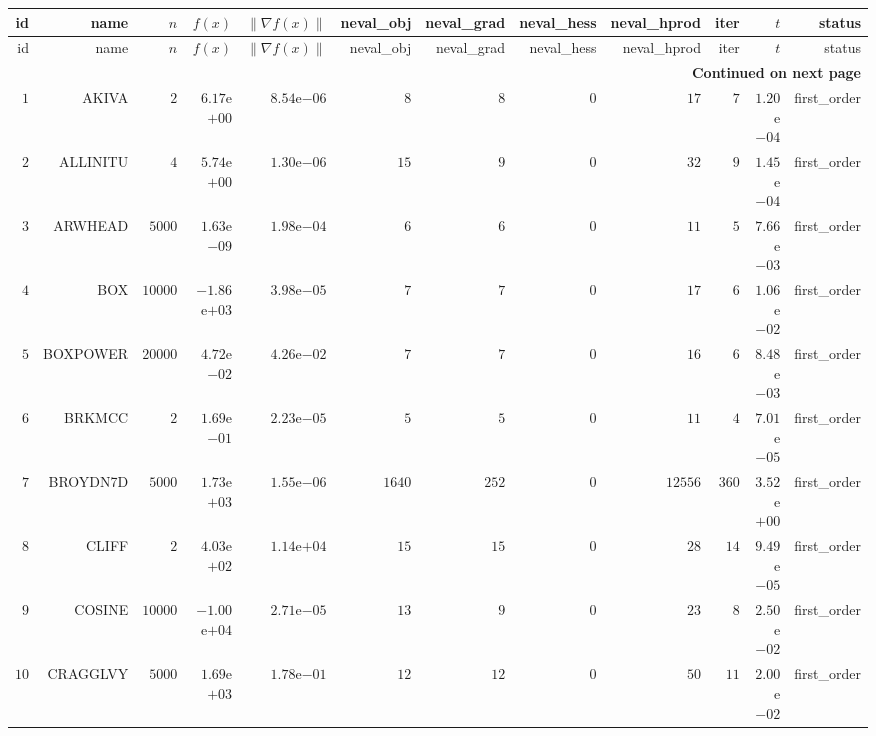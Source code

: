 \begin{longtable}{rrrrrrrrrrrr}
  \hline
  id & name & \(n\) & \(f(x)\) & \(\|\nabla f(x)\|\) & neval\_obj & neval\_grad & neval\_hess & neval\_hprod & iter & \(t\) & status \\\hline
  \endfirsthead
  \hline
  id & name & \(n\) & \(f(x)\) & \(\|\nabla f(x)\|\) & neval\_obj & neval\_grad & neval\_hess & neval\_hprod & iter & \(t\) & status \\\hline
  \endhead
  \hline
  \multicolumn{12}{r}{{\bfseries Continued on next page}}\\
  \hline
  \endfoot
  \endlastfoot
  \(     1\) & AKIVA & \(     2\) & \( 6.17\)e\(+00\) & \( 8.54\)e\(-06\) & \(     8\) & \(     8\) & \(     0\) & \(    17\) & \(     7\) & \( 1.20\)e\(-04\) & first\_order \\
  \(     2\) & ALLINITU & \(     4\) & \( 5.74\)e\(+00\) & \( 1.30\)e\(-06\) & \(    15\) & \(     9\) & \(     0\) & \(    32\) & \(     9\) & \( 1.45\)e\(-04\) & first\_order \\
  \(     3\) & ARWHEAD & \(  5000\) & \( 1.63\)e\(-09\) & \( 1.98\)e\(-04\) & \(     6\) & \(     6\) & \(     0\) & \(    11\) & \(     5\) & \( 7.66\)e\(-03\) & first\_order \\
  \(     4\) & BOX & \( 10000\) & \(-1.86\)e\(+03\) & \( 3.98\)e\(-05\) & \(     7\) & \(     7\) & \(     0\) & \(    17\) & \(     6\) & \( 1.06\)e\(-02\) & first\_order \\
  \(     5\) & BOXPOWER & \( 20000\) & \( 4.72\)e\(-02\) & \( 4.26\)e\(-02\) & \(     7\) & \(     7\) & \(     0\) & \(    16\) & \(     6\) & \( 8.48\)e\(-03\) & first\_order \\
  \(     6\) & BRKMCC & \(     2\) & \( 1.69\)e\(-01\) & \( 2.23\)e\(-05\) & \(     5\) & \(     5\) & \(     0\) & \(    11\) & \(     4\) & \( 7.01\)e\(-05\) & first\_order \\
  \(     7\) & BROYDN7D & \(  5000\) & \( 1.73\)e\(+03\) & \( 1.55\)e\(-06\) & \(  1640\) & \(   252\) & \(     0\) & \( 12556\) & \(   360\) & \( 3.52\)e\(+00\) & first\_order \\
  \(     8\) & CLIFF & \(     2\) & \( 4.03\)e\(+02\) & \( 1.14\)e\(+04\) & \(    15\) & \(    15\) & \(     0\) & \(    28\) & \(    14\) & \( 9.49\)e\(-05\) & first\_order \\
  \(     9\) & COSINE & \( 10000\) & \(-1.00\)e\(+04\) & \( 2.71\)e\(-05\) & \(    13\) & \(     9\) & \(     0\) & \(    23\) & \(     8\) & \( 2.50\)e\(-02\) & first\_order \\
  \(    10\) & CRAGGLVY & \(  5000\) & \( 1.69\)e\(+03\) & \( 1.78\)e\(-01\) & \(    12\) & \(    12\) & \(     0\) & \(    50\) & \(    11\) & \( 2.00\)e\(-02\) & first\_order \\

\end{longtable}
